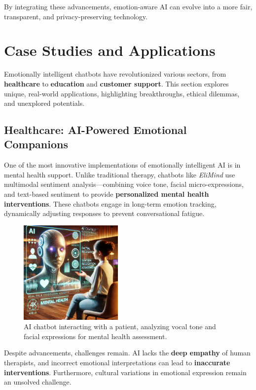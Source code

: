 \documentclass[a4paper,10pt]{article}
\begin{document}
By integrating these advancements, emotion-aware AI can evolve into a more fair, transparent, and privacy-preserving technology.


\section{Case Studies and Applications}
Emotionally intelligent chatbots have revolutionized various sectors, from \textbf{healthcare} to \textbf{education} and \textbf{customer support}. This section explores unique, real-world applications, highlighting breakthroughs, ethical dilemmas, and unexplored potentials.

\subsection{Healthcare: AI-Powered Emotional Companions}
One of the most innovative implementations of emotionally intelligent AI is in mental health support. Unlike traditional therapy, chatbots like \textit{EliMind} use multimodal sentiment analysis—combining voice tone, facial micro-expressions, and text-based sentiment to provide \textbf{personalized mental health interventions}. These chatbots engage in long-term emotion tracking, dynamically adjusting responses to prevent conversational fatigue.

\begin{figure}[h]
    \centering
    \includegraphics[width=0.45\textwidth]{image 11.png}
    \caption{AI chatbot interacting with a patient, analyzing vocal tone and facial expressions for mental health assessment.}
    \label{fig:ai_healthcare}
\end{figure}

Despite advancements, challenges remain. AI lacks the \textbf{deep empathy} of human therapists, and incorrect emotional interpretations can lead to \textbf{inaccurate interventions}. Furthermore, cultural variations in emotional expression remain an unsolved challenge.
\end{document}
